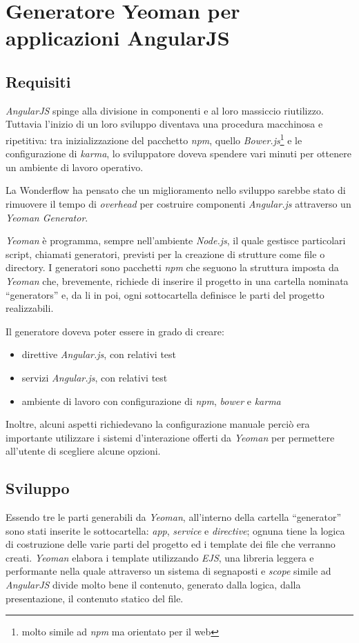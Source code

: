 \section{Generatore Yeoman per applicazioni AngularJS}
\subsection{Requisiti}
\textit{AngularJS} spinge alla divisione in componenti e al loro massiccio
riutilizzo. Tuttavia l'inizio di un loro sviluppo diventava una procedura
macchinosa e ripetitiva: tra inizializzazione del pacchetto \textit{npm},
quello \textit{Bower.js}\footnote{molto simile ad \textit{npm} ma orientato per
il web} e le configurazione di \textit{karma}, lo sviluppatore doveva spendere
vari minuti per ottenere un ambiente di lavoro operativo.

La Wonderflow ha pensato che un miglioramento nello sviluppo sarebbe stato di
rimuovere il tempo di \textit{overhead} per costruire componenti
\textit{Angular.js} attraverso un \textit{Yeoman Generator}.

\textit{Yeoman} è programma, sempre nell'ambiente \textit{Node.js}, il quale
gestisce particolari script, chiamati generatori, previsti per la creazione di
strutture come file o directory. I generatori sono pacchetti \textit{npm} che
seguono la struttura imposta da \textit{Yeoman} che, brevemente, richiede di
inserire il progetto in una cartella nominata ``generators'' e, da li in poi,
ogni sottocartella definisce le parti del progetto realizzabili.

Il generatore doveva poter essere in grado di creare:
\begin{itemize}
\item direttive \textit{Angular.js}, con relativi test
\item servizi \textit{Angular.js}, con relativi test
\item ambiente di lavoro con configurazione di \textit{npm}, \textit{bower} e
\textit{karma}
\end{itemize}

Inoltre, alcuni aspetti richiedevano la configurazione manuale perciò era
importante utilizzare i sistemi d'interazione offerti da \textit{Yeoman} per
permettere all'utente di scegliere alcune opzioni.

\subsection{Sviluppo}
Essendo tre le parti generabili da \textit{Yeoman}, all'interno della cartella
``generator'' sono stati inserite le sottocartella: \textit{app},
\textit{service} e \textit{directive}; ognuna tiene la logica di costruzione
delle varie parti del progetto ed i template dei file che verranno creati.
\textit{Yeoman} elabora i template utilizzando \textit{EJS}, una libreria
leggera e performante nella quale attraverso un sistema di segnaposti e
\textit{scope} simile ad \textit{AngularJS} divide molto bene il contenuto,
generato dalla logica, dalla presentazione, il contenuto statico del file.

